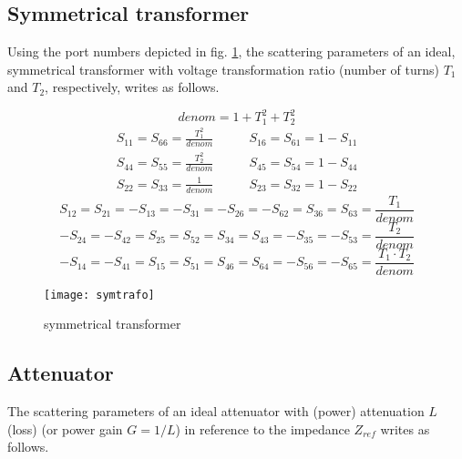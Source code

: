 \subsection{Symmetrical transformer}

Using the port numbers depicted in fig. \ref{fig:symtrafo}, the
scattering parameters of an ideal, symmetrical transformer with
voltage transformation ratio (number of turns) $T_1$ and $T_2$,
respectively, writes as follows.

\begin{equation}
denom = 1+T_1^2+T_2^2
\end{equation}
\begin{eqnarray}
S_{11} = S_{66} = \frac{T_1^2}{denom}  &  \qquad S_{16} = S_{61} = 1-S_{11} \\
S_{44} = S_{55} = \frac{T_2^2}{denom}  &  \qquad S_{45} = S_{54} = 1-S_{44} \\
S_{22} = S_{33} = \frac{1}{denom}  &  \qquad S_{23} = S_{32} = 1-S_{22}
\end{eqnarray}
\begin{equation}
S_{12} = S_{21} = -S_{13} = -S_{31} = -S_{26} = -S_{62} = S_{36} = S_{63}
       = \frac{T_1}{denom}
\end{equation}
\begin{equation}
-S_{24} = -S_{42} = S_{25} = S_{52} = S_{34} = S_{43} = -S_{35} = -S_{53}
       = \frac{T_2}{denom}
\end{equation}
\begin{equation}
-S_{14} = -S_{41} = S_{15} = S_{51} = S_{46} = S_{64} = -S_{56} = -S_{65}
       = \frac{T_1\cdot T_2}{denom}
\end{equation}

\begin{figure}[ht]
\begin{center}
\texttt{[image: symtrafo]}
\end{center}
\caption{symmetrical transformer}
\label{fig:symtrafo}
\end{figure}
\FloatBarrier

\subsection{Attenuator}

The scattering parameters of an ideal attenuator with (power)
attenuation $L$ (loss) (or power gain $G=1/L$) in reference to the
impedance $Z_{ref}$ writes as follows.

